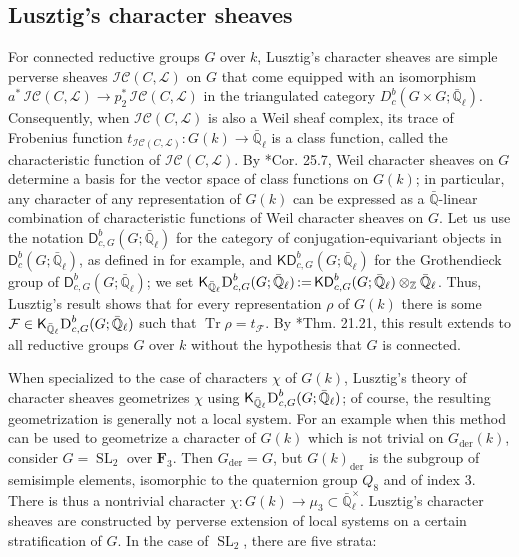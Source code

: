 \documentclass[10pt]{amsart}
\theoremstyle{plain}
\theoremstyle{definition}
\newcommand{\FFF}{{\mathbf{F}_3}}
\newcommand{\ZZ}{{\mathbb{Z}}}
\newcommand{\QQ}{{\mathbb{Q}}}
\newcommand{\EE}{\mathbb{\bar Q}_\ell}
\newcommand{\EEx}{\EE^\times}
\DeclareMathOperator{\trace}{Tr}
\DeclareMathOperator{\SL}{SL}
\newcommand{\der}{_{\operatorname{der}}}
\newcommand{\ceq}{{\, :=\, }}
\newcommand{\trFrob}[1]{t_{#1}}
\newcommand{\cs}[1]{{\mathcal{#1}}}
\newcommand{\IC}{\mathcal{IC}}
\begin{document}
\subsection{Lusztig's character sheaves}\label{ssec:LCS}

For connected reductive groups $G$ over $k$, Lusztig's character sheaves are simple perverse sheaves $\IC(C,\mathcal{L})$ on $G$ that come equipped with an isomorphism $a^*\, \IC(C,\mathcal{L}) \to p_2^*\, \IC(C,\mathcal{L})$ in the triangulated category $D^b_c(G\times G;\EE)$.
Consequently, when $\IC(C,\mathcal{L})$ is also a Weil sheaf complex, its trace of Frobenius function $\trFrob{\IC(C,\cs{L})} : G(k)\to \EE$ is a class function, called the characteristic function of $\IC(C,\cs{L})$.
By \cite{lusztig:86a}*{Cor. 25.7}, Weil character sheaves on $G$ determine a basis for the vector space of class functions on $G(k)$; in particular, any character of any representation of $G(k)$ can be expressed as a ${\bar \QQ}$-linear combination of characteristic functions of Weil character sheaves on $G$.
Let us use the notation $\mathsf{D}^b_{c,G}(G;\EE)$ for the category of conjugation-equivariant objects in $\mathsf{D}^b_{c}(G;\EE)$, as defined in \cite{bernstein-lunts:equivariant} for example, and $\mathsf{KD}^b_{c,G}(G;\EE)$ for the Grothendieck group of $\mathsf{D}^b_{c,G}(G;\EE)$; we set $\mathsf{K}_{\EE}\textsc{D}^b_{c,G}(G;\EE)\ceq \mathsf{KD}^b_{c,G}(G;\EE)\otimes_{\ZZ} {\EE}$.
Thus, Lusztig's result shows that for every representation $\rho$ of $G(k)$ there is some $\cs{F}\in \mathsf{K}_{\EE}\textsc{D}^b_{c,G}(G;\EE)$ such that $\trace\rho = \trFrob{\cs{F}}$.
By \cite{lusztig:disconnected4}*{Thm. 21.21}, this result extends to all reductive groups $G$ over $k$ without the hypothesis that $G$ is connected.%

When specialized to the case of characters $\chi$ of $G(k)$, Lusztig's theory of character sheaves geometrizes $\chi$ using $\mathsf{K}_{\EE}\textsc{D}^b_{c,G}(G;\EE)$; of course, the resulting geometrization is generally not a local system.
%
For an example when this method can be used to geometrize a character of $G(k)$ which is not trivial on $G\der(k)$, consider $G = \SL_2$ over $\FFF$.
Then $G\der = G$, but $G(k)\der$ is the subgroup of semisimple elements,
isomorphic to the quaternion group $Q_8$ and of index $3$.
There is thus a nontrivial character $\chi : G(k) \to \mu_3 \subset \EEx$.  
Lusztig's character sheaves are constructed by perverse extension of local systems on a certain stratification of $G$.
In the case of $\SL_2$, there are five strata:
\vspace{0.1in}
\end{document}
